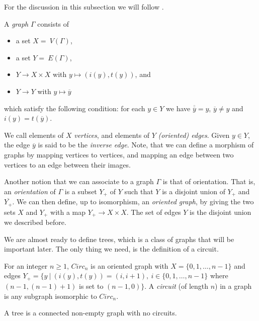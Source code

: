 For the discussion in this subsection we will follow \cite[chapter I]{Ser80}.
\begin{definition}
    A \emph{graph} $\Gamma$ consists of 
    \begin{itemize}
        \item a set $X = \:V(\Gamma)$,
        \item a set $Y = \:E(\Gamma)$,
        \item $Y \to  X \times X$ with $ y \mapsto (i(y), t(y))$, and 
        \item $Y \to Y$ with $y \mapsto \overline{y}$
    \end{itemize}
     which satisfy the following condition: for each $y \in Y$ we have $\overline{\overline{y}} = y$, $\overline{y} \neq y$ and $i(y) = t(\overline{y})$.
\end{definition}

We call elements of $X$ \emph{vertices}, and elements of $Y$ \emph{(oriented) edges}. Given $y \in Y$, the edge $\overline{y}$ is said to be the \emph{inverse edge}. Note, that we can define a morphism of graphs by mapping vertices to vertices, and mapping an edge between two vertices to an edge between their images.

Another notion that we can associate to a graph $\Gamma$ is that of orientation. That is, an \emph{orientation} of $\Gamma$ is a subset $Y_+$ of $Y$ such that $Y$ is a disjoint union of $Y_+$ and $\overline{Y_+}$. We can then define, up to isomorphism, an \emph{oriented graph}, by giving the two sets $X$ and $Y_+$ with a map $Y_+ \to X \times X$. The set of edges $Y$ is the disjoint union we described before.

We are almost ready to define trees, which is a class of graphs that will be important later. The only thing we need, is the definition of a circuit.

\begin{definition}
    For an integer $n \ge 1$, $Circ_n$ is an oriented graph with $X = \{0,1, \ldots , n-1 \}$ and edges $Y_+ = \{ y \:| \: (i(y),t(y)) = (i,i+1), \: i\in \{0,1,\ldots,n-1\} $ where $(n-1, (n-1) + 1)$ is set to $(n-1,0)\}$. A \emph{circuit} (of length $n$) in a graph is any subgraph isomorphic to $Circ_n$.
\end{definition}

\begin{definition} 
    A tree is a connected non-empty graph with no circuits.
\end{definition}

